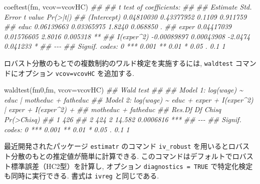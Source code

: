 \documentclass[
  letterpaper,
  xelatex,
  ja=standard, xelatex]{bxjsbook}
\newenvironment{Shaded}{\begin{snugshade}}{\end{snugshade}}
\newcommand{\AttributeTok}[1]{\textcolor[rgb]{0.40,0.45,0.13}{#1}}
\newcommand{\DocumentationTok}[1]{\textcolor[rgb]{0.37,0.37,0.37}{\textit{#1}}}
\newcommand{\FunctionTok}[1]{\textcolor[rgb]{0.28,0.35,0.67}{#1}}
\newcommand{\NormalTok}[1]{\textcolor[rgb]{0.00,0.23,0.31}{#1}}
\begin{document}
\begin{Shaded}
\begin{Highlighting}[]
\FunctionTok{coeftest}\NormalTok{(fm, }\AttributeTok{vcov=}\NormalTok{vcovHC)}
\DocumentationTok{\#\# }
\DocumentationTok{\#\# t test of coefficients:}
\DocumentationTok{\#\# }
\DocumentationTok{\#\#                Estimate  Std. Error t value Pr(\textgreater{}|t|)   }
\DocumentationTok{\#\# (Intercept)  0.04810030  0.43377952  0.1109 0.911759   }
\DocumentationTok{\#\# educ         0.06139663  0.03365975  1.8240 0.068850 . }
\DocumentationTok{\#\# exper        0.04417039  0.01576605  2.8016 0.005318 **}
\DocumentationTok{\#\# I(exper\^{}2)  {-}0.00089897  0.00043908 {-}2.0474 0.041233 * }
\DocumentationTok{\#\# {-}{-}{-}}
\DocumentationTok{\#\# Signif. codes:  0 \textquotesingle{}***\textquotesingle{} 0.001 \textquotesingle{}**\textquotesingle{} 0.01 \textquotesingle{}*\textquotesingle{} 0.05 \textquotesingle{}.\textquotesingle{} 0.1 \textquotesingle{} \textquotesingle{} 1}
\end{Highlighting}
\end{Shaded}

ロバスト分散のもとでの複数制約のワルド検定を実施するには,
\texttt{waldtest} コマンドにオプション \texttt{vcov=vcovHC} を追加する.

\begin{Shaded}
\begin{Highlighting}[]
\FunctionTok{waldtest}\NormalTok{(fm0,fm, }\AttributeTok{vcov=}\NormalTok{vcovHC)}
\DocumentationTok{\#\# Wald test}
\DocumentationTok{\#\# }
\DocumentationTok{\#\# Model 1: log(wage) \textasciitilde{} educ | motheduc + fatheduc}
\DocumentationTok{\#\# Model 2: log(wage) \textasciitilde{} educ + exper + I(exper\^{}2) | exper + I(exper\^{}2) + }
\DocumentationTok{\#\#     motheduc + fatheduc}
\DocumentationTok{\#\#   Res.Df Df  Chisq Pr(\textgreater{}Chisq)    }
\DocumentationTok{\#\# 1    426                         }
\DocumentationTok{\#\# 2    424  2 14.582  0.0006816 ***}
\DocumentationTok{\#\# {-}{-}{-}}
\DocumentationTok{\#\# Signif. codes:  0 \textquotesingle{}***\textquotesingle{} 0.001 \textquotesingle{}**\textquotesingle{} 0.01 \textquotesingle{}*\textquotesingle{} 0.05 \textquotesingle{}.\textquotesingle{} 0.1 \textquotesingle{} \textquotesingle{} 1}
\end{Highlighting}
\end{Shaded}

最近開発されたパッケージ \texttt{estimatr} のコマンド
\texttt{iv\_robust}
を用いるとロバスト分散のもとの推定値が簡単に計算できる.
このコマンドはデフォルトでロバスト標準誤差（HC2型）を計算し, オプション
\texttt{diagnostics\ =\ TRUE} で特定化検定も同時に実行できる. 書式は
\texttt{ivreg} と同じである.
\end{document}
